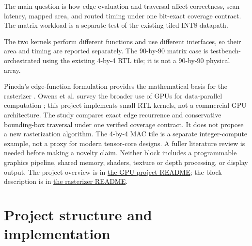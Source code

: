 \documentclass[10pt,a4paper]{article}
\begin{document}
The main question is how edge evaluation and traversal affect correctness,
scan latency, mapped area, and routed timing under one bit-exact coverage
contract. The matrix workload is a separate test of the existing tiled INT8
datapath.

The two kernels perform different functions and use different interfaces,
so their area and timing are reported separately. The 90-by-90 matrix case
is testbench-orchestrated using the existing 4-by-4 RTL tile; it is not a
90-by-90 physical array.

Pineda's edge-function formulation provides the mathematical basis for the
rasterizer \cite{Pineda1988}. Owens et al. survey the broader use of GPUs for
data-parallel computation \cite{OwensGPU2007}; this project implements small
RTL kernels, not a commercial GPU architecture. The study compares exact
edge recurrence and conservative bounding-box traversal under one verified
coverage contract. It does not propose a new rasterization algorithm. The
4-by-4 MAC tile is a separate integer-compute example, not a proxy for
modern tensor-core designs. A fuller literature review is needed before
making a novelty claim. Neither block includes a programmable graphics
pipeline, shared memory, shaders, texture or depth processing, or display
output. The project overview is in
\href{../README.md}{the GPU project README}; the block description is in
\href{../../gpu_triangle/README.md}{the rasterizer README}.

\section{Project structure and implementation}
\end{document}
